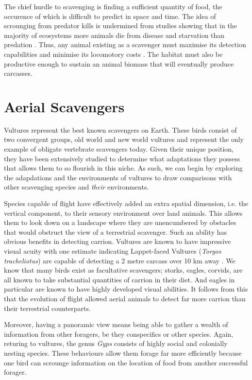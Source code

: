 \documentclass[a4paper,12pt]{article}
\begin{document}
The chief hurdle to scavenging is finding a sufficient quantity of food, the occurence of which is difficult to predict in space and time. The idea of scrounging from predator kills is undermined from studies showing that in the  majority of ecosystems more animals die from disease and starvation than predation \citep{benbow2015introduction}. Thus, any animal existing as a scavenger must maximise its detection capabilities and minimise its locomotory costs \citep{ruxton2004obligate}. The habitat must also be productive enough to sustain an animal biomass that will eventually produce carcasses. 

\section{Aerial Scavengers}

Vultures represent the best known scavengers on Earth. These birds consist of two convergent groups, old world and new world vultures and represent the only example of obligate vertebrate scavengers today. Given their unique position, they have been extensively studied to determine what adaptations they possess that allows them to so flourish in this niche. As such, we can begin by exploring the adapdations and the environments of vultures to draw comparisons with other scavenging species and \textit{their} environments. 

Species capable of flight have effectively added an extra spatial dimension, i.e. the vertical component, to their sensory environment over land animals. This allows them to look down on a landscape where they are unencumbered by obstacles that would obstruct the view of a terrestrial scavenger. Such an ability has obvious benefits in detecting carrion. Vultures are known to have impressive visual acuity with one estimate indicating Lappet-faced Vultures (\textit{Torgos tracheliotus}) are capable of detecting a 2 metre carcass over 10 km away \citep{spiegel2013factors}. We know that many birds exist as facultative scavengers; storks, eagles, corvids, are all known to take substantial quantities of carrion in their diet. And eagles in particular are known to have highly developed visual abilities. It follows from this that the evolution of flight allowed aerial animals to detect far more carrion than their terrestrial counterparts.

Moreover, having a panoramic view means being able to gather a wealth of information from other foragers, be they conspecifics or other species. Again, returing to vultures, the genus \textit{Gyps} consists of highly social and colonially nesting species. These behaviours allow them forage far more efficiently because one bird can scrounge information on the location of food from another successful forager. 
\end{document}
